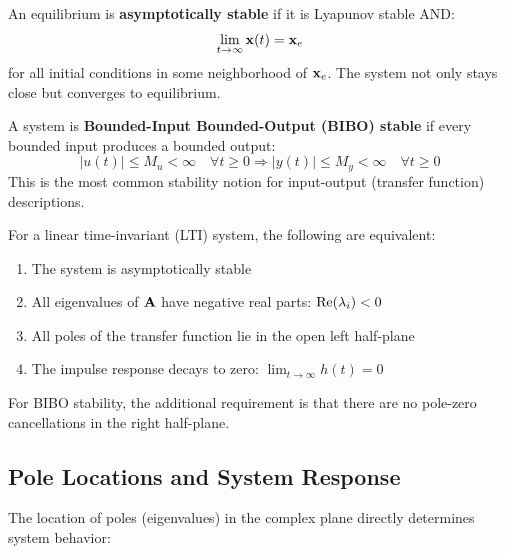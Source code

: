 \begin{definitionbox}[title=Definition: Asymptotic Stability]
An equilibrium is \textbf{asymptotically stable} if it is Lyapunov stable AND:
\begin{equation}
\lim_{t \to \infty} \mathbf{x}(t) = \mathbf{x}_e
\end{equation}
for all initial conditions in some neighborhood of $\mathbf{x}_e$. The system not only stays close but converges to equilibrium.
\end{definitionbox}

\begin{definitionbox}[title=Definition: BIBO Stability]
A system is \textbf{Bounded-Input Bounded-Output (BIBO) stable} if every bounded input produces a bounded output:
\begin{equation}
|u(t)| \leq M_u < \infty \quad \forall t \geq 0 \Rightarrow |y(t)| \leq M_y < \infty \quad \forall t \geq 0
\end{equation}
This is the most common stability notion for input-output (transfer function) descriptions.
\end{definitionbox}

\begin{keyconceptbox}[title=Stability Criterion for LTI Systems]
For a linear time-invariant (LTI) system, the following are equivalent:
\begin{enumerate}
    \item The system is asymptotically stable
    \item All eigenvalues of $\mathbf{A}$ have negative real parts: $\operatorname{Re}(\lambda_i) < 0$
    \item All poles of the transfer function lie in the open left half-plane
    \item The impulse response decays to zero: $\lim_{t\to\infty} h(t) = 0$
\end{enumerate}
For BIBO stability, the additional requirement is that there are no pole-zero cancellations in the right half-plane.
\end{keyconceptbox}

\subsection{Pole Locations and System Response}

The location of poles (eigenvalues) in the complex plane directly determines system behavior:

